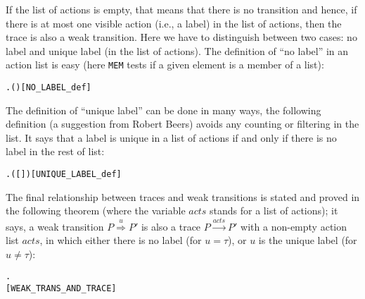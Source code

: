 If the list of actions is empty, that means that there is no transition and hence,
if there is at most one visible action (i.e., a label) in the list of actions,
then the trace is also a weak transition. Here
we have to distinguish between two cases: no label and unique label (in
the list of actions). The definition of ``no
label'' in an action list is easy (here \texttt{MEM} tests if a given element is a member of a list):
\begin{alltt}
  \HOLSymConst{\HOLTokenEquiv{}} \HOLSymConst{\HOLTokenNeg{}}\HOLSymConst{\HOLTokenExists{}}.  ( ) \hfill{[NO_LABEL_def]}
\end{alltt}

The definition of ``unique label'' can be done in many ways, the
following definition (a suggestion from Robert Beers)
avoids any counting or filtering in the list.
It says that a label is unique in a list of actions if and only if there is no
label in the rest of list:
\begin{alltt}
   \HOLSymConst{\HOLTokenEquiv{}}
\HOLSymConst{\HOLTokenExists{}} . ( \HOLSymConst{\HOLTokenDoublePlus} [] \HOLSymConst{\HOLTokenDoublePlus}  \HOLSymConst{=} ) \HOLSymConst{\HOLTokenConj{}}   \HOLSymConst{\HOLTokenConj{}}  \hfill{[UNIQUE_LABEL_def]}
\end{alltt}

The final relationship between traces and weak transitions is stated
and proved in the following theorem
(where the  variable $acts$ stands for
a list of actions); 
it says, a weak transition $P\overset{u}{\Rightarrow}P'$ is also a
trace $P\overset{acts}{\longrightarrow}P'$ with a
 non-empty action list $acts$, in which either there is no label (for $u = \tau$), or 
$u$ is the unique label (for $u \neq \tau$):
\begin{alltt}
\HOLTokenTurnstile{}  \HOLTokenWeakTransBegin{}\HOLTokenWeakTransEnd {} \HOLSymConst{\HOLTokenEquiv{}}
   \HOLSymConst{\HOLTokenExists{}}.
           \HOLSymConst{\HOLTokenConj{}} \HOLSymConst{\HOLTokenNeg{}}  \HOLSymConst{\HOLTokenConj{}}
         \HOLSymConst{=} \HOLSymConst{\ensuremath{\tau}}       \hfill{[WEAK_TRANS_AND_TRACE]}
\end{alltt}

